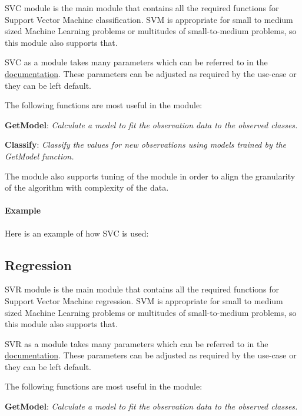 SVC module is the main module that contains all the required functions for Support Vector Machine classification. SVM is appropriate for small to medium sized Machine Learning problems or multitudes of small-to-medium problems, so this module also supports that. 

SVC as a module takes many parameters which can be referred to in the \href{https://cdn.hpccsystems.com/pdf/ml/SupportVectorMachines.pdf}{documentation}. These parameters can be adjusted as required by the use-case or they can be left default. 

The following functions are most useful in the module:

\textbf{GetModel}: \textit{Calculate a model to fit the observation data to the observed classes.}

\textbf{Classify}: \textit{Classify the values for new observations using models trained by the GetModel function.}

The module also supports tuning of the module in order to align the granularity of the algorithm with complexity of the data.

\paragraph{Example}

Here is an example of how SVC is used:



\subsection{Regression}

SVR module is the main module that contains all the required functions for Support Vector Machine regression. SVM is appropriate for small to medium sized Machine Learning problems or multitudes of small-to-medium problems, so this module also supports that. 

SVR as a module takes many parameters which can be referred to in the \href{https://cdn.hpccsystems.com/pdf/ml/SupportVectorMachines.pdf}{documentation}. These parameters can be adjusted as required by the use-case or they can be left default. 

The following functions are most useful in the module:

\textbf{GetModel}: \textit{Calculate a model to fit the observation data to the observed classes.}

